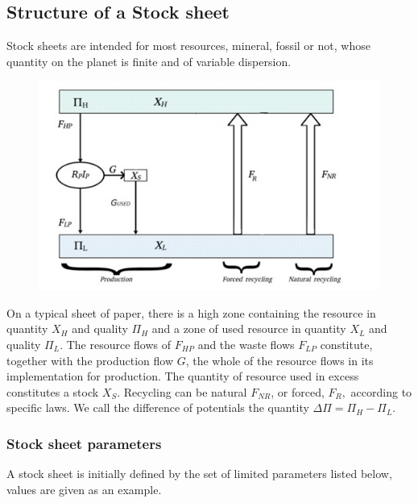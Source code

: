 \documentclass[12pt,a4paper]{article}%
\begin{document}
\subsection{Structure of a Stock sheet}

Stock sheets are intended for most resources, mineral, fossil or not, whose quantity on the planet is finite and of variable dispersion.

\begin{figure}[h]
\centering
\includegraphics[width=1.0\textwidth]{figures/FeuilleStock.jpg}\end{figure}

On a typical sheet of paper, there is a high zone containing the resource in quantity $X_{H}$ and quality $\Pi_{H}$ and a zone of used resource in quantity $X_{L}$ and quality $\Pi_{L}$. The resource flows of $F_{HP}$ and the waste flows $F_{LP}$ constitute, together with the production flow $G$, the whole of the resource flows in its implementation for production.
The quantity of resource used in excess constitutes a stock $X_{S}$. Recycling can be natural $F_{NR}$, or forced, $F_{R},$ according to specific laws. We call the difference of potentials the quantity $\Delta \Pi=\Pi_{H}-\Pi_{L}$.



\subsubsection{Stock sheet parameters}

A stock sheet is initially defined by the set of limited parameters listed below, values are given as an example.
\end{document}
